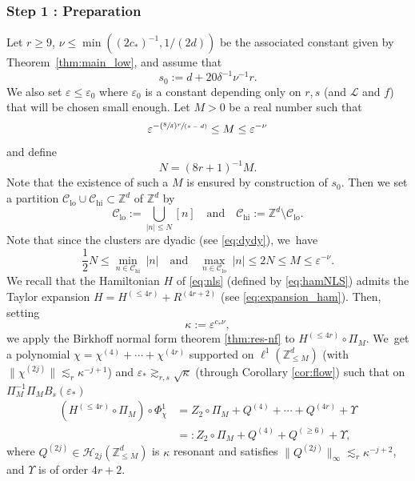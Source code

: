 \documentclass[10pt,a4paper]{amsart}
\newcommand{\Psfrac}[2]{(\sfrac{#1}{#2})}
\newcommand{\spfrac}[2]{\sfrac{#1}{(#2)}}
\theoremstyle{plain}
\theoremstyle{definition}
\DeclareMathOperator{\hi}{hi}
\DeclareMathOperator{\lo}{lo}
\newcommand{\1}{\mathbf{1}}
\newcommand{\Clo}{\mathscr{C}_{\lo}}
\newcommand{\Chigh}{\mathscr{C}_{\hi}}
\begin{document}
\subsubsection*{Step 1 : Preparation}
Let $r\geq 9$, $\nu \leq \min((2c_\ast)^{-1},1/(2d))$ be the associated constant given by Theorem~\ref{thm:main_low}, and assume that
\begin{equation}
\label{eq:s}
s_0 := d+20 \delta^{-1} \nu^{-1} r.
\end{equation}
We also set $\varepsilon \leq \varepsilon_0$ where $\varepsilon_0$ is a constant depending only on $r,s$ (and $\mathscr{L}$ and $f$) that will be chosen small enough. Let $M>0$ be a real number such that
\begin{equation}
\label{eq:boundonM}
\varepsilon^{-\Psfrac{8}{\delta}\spfrac{r}{s-d}}\leq M \leq \varepsilon^{-{\nu}}
\end{equation}
and define
\[
N = (8r+1)^{-1} M.
\]
Note that the existence of such a $M$ is ensured by construction of $s_0$.
Then we set a partition $\Clo\cup \Chigh \subset \mathbb{Z}^d$ of $\mathbb{Z}^d$ by
\begin{equation}
\label{eq:Clo}
\Clo := \bigcup_{|n|\leq N}[n] \quad \mathrm{and} \quad \Chigh := \mathbb{Z}^d \setminus \Clo.
\end{equation}
Note that since the clusters are dyadic (see \eqref{eq:dydy}), we~have
\begin{equation}
\label{eq:m-high}
\frac{1}{2}N\leq \underset{n\in\Chigh}{\min}\ |n|\quad \mathrm{and} \quad \underset{n\in\Clo}{\max}\ |n|\leq 2N \leq M \leq \varepsilon^{-{\nu}}.
\end{equation}
We recall that the Hamiltonian $H$ of \eqref{eq:nls} (defined by \eqref{eq:hamNLS}) admits the Taylor expansion $H = H^{(\leq 4r)} + R^{(4r+2)} $ (see \eqref{eq:expansion_ham}). Then, setting
\[
\kappa := \varepsilon^{c_\ast \nu},
\]
we apply the Birkhoff normal form theorem \ref{thm:res-nf} to $H^{(\leq 4r)}\circ \Pi_M$. We~get a polynomial $\chi = \chi^{(4)} + \cdots + \chi^{(4r)}$ supported on $\ell^1(\mathbb{Z}^d_{\leq M})$ (with $\| \chi^{(2j)}\| \lesssim_r \kappa^{-j+1} $) and $\varepsilon_\ast \gtrsim_{r,s} \sqrt{\kappa}$ (through Corollary \ref{cor:flow})
such that on $\Pi_{ M}^{-1}\Pi_{ M}B_s(\varepsilon_*) $
\begin{equation}
\label{eq:defHloflat}
\begin{split}
(H^{(\leq 4r)}\circ \Pi_M) \circ \Phi_{\chi}^1 &= Z_2\circ \Pi_M + Q^{(4)} + \cdots+ Q^{(4r)} + \Upsilon \\
& =: Z_2\circ \Pi_M + Q^{(4)} + Q^{(\geq 6)} + \Upsilon,
\end{split}
\end{equation}
where $Q^{(2j)} \in \mathcal{H}_{2j}(\mathbb{Z}^d_{\leq M})$ is $\kappa$ resonant and satisfies $\| Q^{(2j)} \|_{\infty} \lesssim_r \kappa^{-j+2}$, and $ \Upsilon$ is of order $4r +2$.
\end{document}
